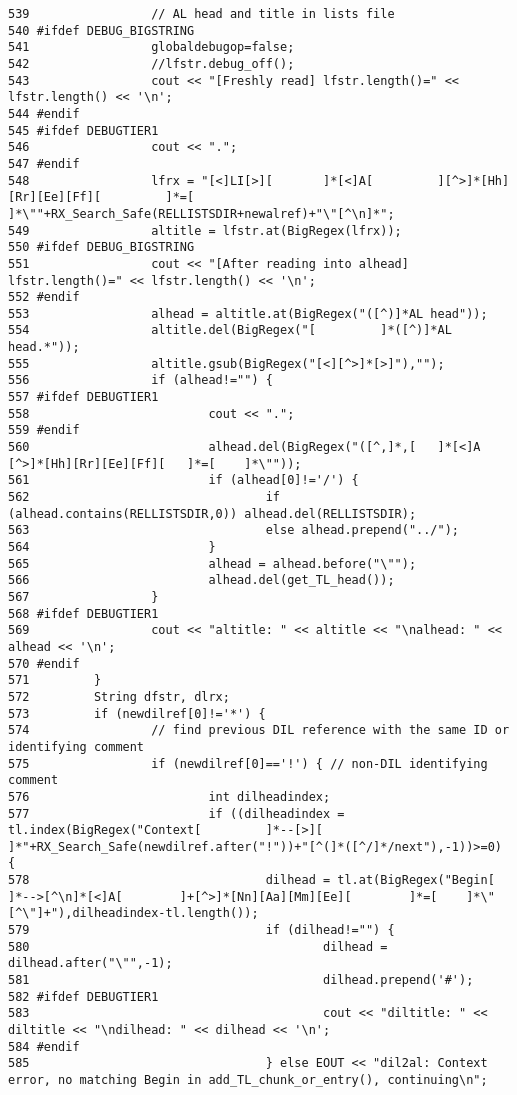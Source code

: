 \begin{verbatim}
539                 // AL head and title in lists file
540 #ifdef DEBUG_BIGSTRING
541                 globaldebugop=false;
542                 //lfstr.debug_off();
543                 cout << "[Freshly read] lfstr.length()=" << lfstr.length() << '\n';
544 #endif
545 #ifdef DEBUGTIER1
546                 cout << ".";
547 #endif
548                 lfrx = "[<]LI[>][       ]*[<]A[         ][^>]*[Hh][Rr][Ee][Ff][         ]*=[    ]*\""+RX_Search_Safe(RELLISTSDIR+newalref)+"\"[^\n]*";
549                 altitle = lfstr.at(BigRegex(lfrx));
550 #ifdef DEBUG_BIGSTRING
551                 cout << "[After reading into alhead] lfstr.length()=" << lfstr.length() << '\n';
552 #endif
553                 alhead = altitle.at(BigRegex("([^)]*AL head"));
554                 altitle.del(BigRegex("[         ]*([^)]*AL head.*"));
555                 altitle.gsub(BigRegex("[<][^>]*[>]"),"");
556                 if (alhead!="") {
557 #ifdef DEBUGTIER1
558                         cout << ".";
559 #endif
560                         alhead.del(BigRegex("([^,]*,[   ]*[<]A [^>]*[Hh][Rr][Ee][Ff][   ]*=[    ]*\""));
561                         if (alhead[0]!='/') {
562                                 if (alhead.contains(RELLISTSDIR,0)) alhead.del(RELLISTSDIR);
563                                 else alhead.prepend("../");
564                         }
565                         alhead = alhead.before("\"");
566                         alhead.del(get_TL_head());
567                 }
568 #ifdef DEBUGTIER1
569                 cout << "altitle: " << altitle << "\nalhead: " << alhead << '\n';
570 #endif
571         }
572         String dfstr, dlrx;
573         if (newdilref[0]!='*') {
574                 // find previous DIL reference with the same ID or identifying comment
575                 if (newdilref[0]=='!') { // non-DIL identifying comment
576                         int dilheadindex;
577                         if ((dilheadindex = tl.index(BigRegex("Context[         ]*--[>][        ]*"+RX_Search_Safe(newdilref.after("!"))+"[^(]*([^/]*/next"),-1))>=0) {
578                                 dilhead = tl.at(BigRegex("Begin[        ]*-->[^\n]*[<]A[        ]+[^>]*[Nn][Aa][Mm][Ee][        ]*=[    ]*\"[^\"]+"),dilheadindex-tl.length());
579                                 if (dilhead!="") {
580                                         dilhead = dilhead.after("\"",-1);
581                                         dilhead.prepend('#');
582 #ifdef DEBUGTIER1
583                                         cout << "diltitle: " << diltitle << "\ndilhead: " << dilhead << '\n';
584 #endif
585                                 } else EOUT << "dil2al: Context error, no matching Begin in add_TL_chunk_or_entry(), continuing\n";

\end{verbatim}
